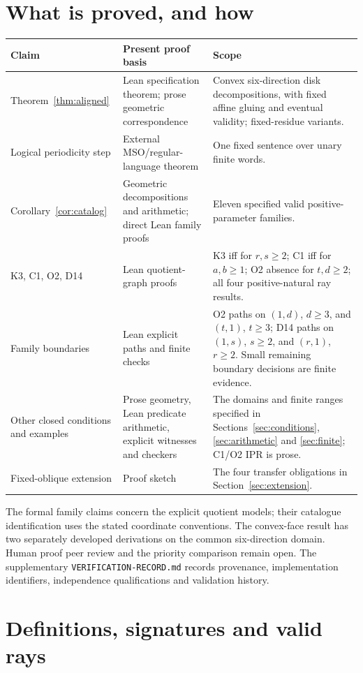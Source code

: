\documentclass[11pt]{amsart}
\newcommand{\record}[1]{\nolinkurl{#1}}
\theoremstyle{definition}\newtheorem{definition}{Definition}
\begin{document}
\section{What is proved, and how}\label{sec:guarantees}
\begin{center}\small
\begin{tabular}{p{}p{}p{}}
\toprule Claim & Present proof basis & Scope\\\midrule
Theorem~\ref{thm:aligned} & Lean specification theorem; prose geometric correspondence & Convex six-direction disk decompositions, with fixed affine gluing and eventual validity; fixed-residue variants.\\
Logical periodicity step & External MSO/regular-language theorem & One fixed sentence over unary finite words.\\
Corollary~\ref{cor:catalog} & Geometric decompositions and arithmetic; direct Lean family proofs & Eleven specified valid positive-parameter families.\\
K3, C1, O2, D14 & Lean quotient-graph proofs & K3 iff for $r,s\ge2$; C1 iff for $a,b\ge1$; O2 absence for $t,d\ge2$; all four positive-natural ray results.\\
Family boundaries & Lean explicit paths and finite checks & O2 paths on $(1,d)$, $d\ge3$, and $(t,1)$, $t\ge3$; D14 paths on $(1,s)$, $s\ge2$, and $(r,1)$, $r\ge2$. Small remaining boundary decisions are finite evidence.\\
Other closed conditions and examples & Prose geometry, Lean predicate arithmetic, explicit witnesses and checkers & The domains and finite ranges specified in Sections~\ref{sec:conditions}, \ref{sec:arithmetic} and \ref{sec:finite}; C1/O2 IPR is prose.\\
Fixed-oblique extension & Proof sketch & The four transfer obligations in Section~\ref{sec:extension}.\\
\bottomrule
\end{tabular}
\end{center}
The formal family claims concern the explicit quotient models; their
catalogue identification uses the stated coordinate conventions.
The convex-face result has two separately developed derivations on
the common six-direction domain. Human proof peer review and the
priority comparison remain open. The supplementary
\record{VERIFICATION-RECORD.md} records provenance, implementation
identifiers, independence qualifications and validation history.

\section{Definitions, signatures and valid rays}\label{sec:definitions}
\end{document}
